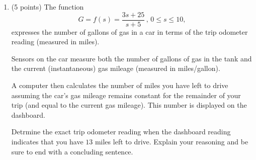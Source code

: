 \documentclass{ximera}
\begin{document}
\begin{enumerate}








\item (5 points) The function
\[
       G = f(s) = \frac{3s+25}{s+5} \, , \, 0\leq s \leq 10 ,
\]
expresses the number of gallons of gas in a car in terms of the trip odometer reading (measured in miles).

Sensors on the car measure both the number of gallons of gas in the tank and the current (instantaneous) gas mileage (measured in miles/gallon).

A computer then calculates the number of miles you have left to drive assuming the car's gas mileage remains constant for the remainder of your trip (and equal to the current gas mileage). This number is displayed on the dashboard.

Detrmine the exact trip odometer reading when the dashboard reading indicates that you have $13$ miles left to drive. Explain your reasoning and be sure to end with a concluding sentence.




\end{enumerate}
\end{document}
